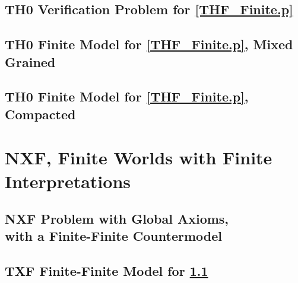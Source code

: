 \documentclass{easychair}
\begin{document}
\newpage
\subsection{TH0 Verification Problem for \ref{THF_Finite.p}}
\label{THF_Finite.s.p}
\begin{small}

\end{small}

\newpage
\subsection{TH0 Finite Model for \ref{THF_Finite.p}, Mixed Grained}
\label{THF_Finite_Medium.s}
\begin{small}

\end{small}

\newpage
\subsection{TH0 Finite Model for \ref{THF_Finite.p}, Compacted}
\label{THF_Finite_Compact.s}
\begin{small}

\end{small}

\newpage
\section{NXF, Finite Worlds with Finite Interpretations}
\label{NXF}

\subsection{NXF Problem with Global Axioms, \\ with a Finite-Finite Countermodel}
\label{NXF_Finite-Finite-Global.p}
\begin{small}

\end{small}

\newpage
\subsection{TXF Finite-Finite Model for \ref{NXF_Finite-Finite-Global.p}}
\label{NXF_Finite-Finite-Global.s}
\begin{small}

\end{small}
\end{document}
